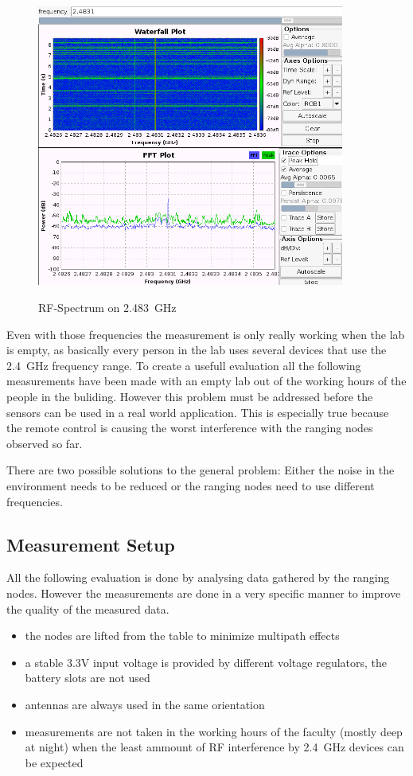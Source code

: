 \begin{figure}[H]
	\centering
\includegraphics[width=0.9\textwidth]{figures/ranging_0.png}
\label{spectrum2483}
\caption{RF-Spectrum on \SI{2.483}{\giga\hertz}}
\end{figure}


Even with those frequencies the measurement is only really working when the lab is empty, as basically every person in the lab uses several devices that use the \SI{2.4}{GHz} frequency range.
To create a usefull evaluation all the following measurements have been made with an empty lab out of the working hours of the people in the buliding.
However this problem must be addressed before the sensors can be used in a real world application.
This is especially true because the remote control is causing the worst interference with the ranging nodes observed so far.

There are two possible solutions to the general problem: Either the noise in the environment needs to be reduced or the ranging nodes need to use different frequencies.


\subsection{Measurement Setup}

All the following evaluation is done by analysing data gathered by the ranging nodes.
However the measurements are done in a very specific manner to improve the quality of the measured data.
\begin{itemize}
	\item the nodes are lifted from the table to minimize multipath effects
	\item a stable 3.3V input voltage is provided by different voltage regulators, the battery slots are not used
	\item antennas are always used in the same orientation
	\item measurements are not taken in the working hours of the faculty (mostly deep at night) when the least ammount of RF interference by \SI{2.4}{GHz} devices can be expected
\end{itemize}

